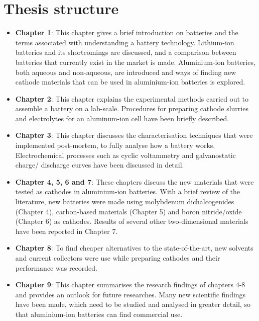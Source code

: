 \section*{\centering Thesis structure}
\begin{itemize}
    \item \textbf{Chapter 1}: This chapter gives a brief introduction on batteries and the terms associated with understanding a battery technology. Lithium-ion batteries and its shortcomings are discussed, and a comparison between batteries that currently exist in the market is made. Aluminium-ion batteries, both aqueous and non-aqueous, are introduced and ways of finding new cathode materials that can be used in aluminium-ion batteries is explored.
    \item \textbf{Chapter 2}: This chapter explains the experimental methods carried out to assemble a battery on a lab-scale. Procedures for preparing cathode slurries and electrolytes for an aluminum-ion cell have been briefly described.  
    \item \textbf{Chapter 3}: This chapter discusses the characterisation techniques that were implemented post-mortem, to fully analyse how a battery works. Electrochemical processes such as cyclic voltammetry and galvanostatic charge/ discharge curves have been discussed in detail.   
    \item \textbf{Chapter 4, 5, 6 and 7}: These chapters discuss the new materials that were tested as cathodes in aluminium-ion batteries. With a brief review of the literature, new batteries were made using molybdenum dichalcogenides (Chapter 4), carbon-based materials (Chapter 5) and boron nitride/oxide (Chapter 6) as cathodes. Results of several other two-dimensional materials have been reported in Chapter 7. 
    \item \textbf{Chapter 8}: To find cheaper alternatives to the state-of-the-art, new solvents and current collectors were use while preparing cathodes and their performance was recorded.   
    \item \textbf{Chapter 9}: This chapter summarises the research findings of chapters 4-8 and provides an outlook for future researches. Many new scientific findings have been made, which need to be studied and analysed in greater detail, so that aluminium-ion batteries can find commercial use.
    \end{itemize}
